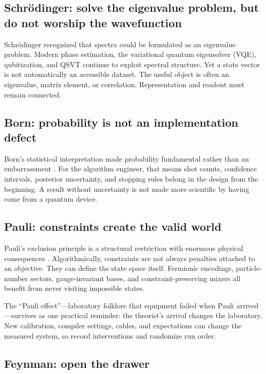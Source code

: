 \subsection{Schr\"odinger: solve the eigenvalue problem, but do not worship the wavefunction}

Schr\"odinger recognized that spectra could be formulated as an eigenvalue problem. Modern phase estimation, the variational quantum eigensolver (VQE), qubitization, and QSVT continue to exploit spectral structure. Yet a state vector is not automatically an accessible dataset. The useful object is often an eigenvalue, matrix element, or correlation. Representation and readout must remain connected.

\subsection{Born: probability is not an implementation defect}

Born's statistical interpretation made probability fundamental rather than an embarrassment \citep{born1954}. For the algorithm engineer, that means shot counts, confidence intervals, posterior uncertainty, and stopping rules belong in the design from the beginning. A result without uncertainty is not made more scientific by having come from a quantum device.

\subsection{Pauli: constraints create the valid world}

Pauli's exclusion principle is a structural restriction with enormous physical consequences \citep{pauli1946}. Algorithmically, constraints are not always penalties attached to an objective. They can define the state space itself. Fermionic encodings, particle-number sectors, gauge-invariant bases, and constraint-preserving mixers all benefit from never visiting impossible states.

The ``Pauli effect''---laboratory folklore that equipment failed when Pauli arrived \citep{paulieffect}---survives as one practical reminder: the theorist's arrival changes the laboratory. New calibration, compiler settings, cables, and expectations can change the measured system, so record interventions and randomize run order.

\subsection{Feynman: open the drawer}

